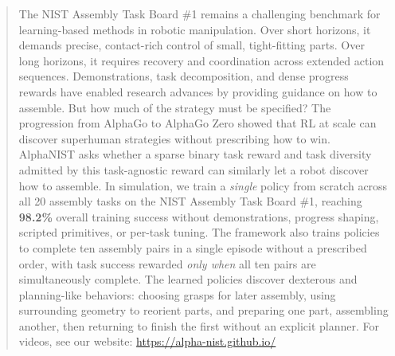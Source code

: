 \maketitle
\thispagestyle{empty}
\pagestyle{empty}

\begin{abstract}
The NIST Assembly Task Board \#1 remains a challenging benchmark for learning-based methods in robotic manipulation.
Over short horizons, it demands precise, contact-rich control of small, tight-fitting parts.
Over long horizons, it requires recovery and coordination across extended action sequences.
Demonstrations, task decomposition, and dense progress rewards have enabled research advances by providing guidance on how to assemble.
But how much of the strategy must be specified?
The progression from AlphaGo to AlphaGo Zero showed that RL at scale can discover superhuman strategies without prescribing how to win.
AlphaNIST asks whether a sparse binary task reward and task diversity admitted by this task-agnostic reward can similarly let a robot discover how to assemble.
In simulation, we train a \textit{single} policy from scratch across all 20 assembly tasks on the NIST Assembly Task Board \#1, reaching \textbf{98.2\%} overall training success without demonstrations, progress shaping, scripted primitives, or per-task tuning.
The framework also trains policies to complete ten assembly pairs in a single episode without a prescribed order, with task success rewarded \textit{only when} all ten pairs are simultaneously complete.
The learned policies discover dexterous and planning-like behaviors: choosing grasps for later assembly, using surrounding geometry to reorient parts, and preparing one part, assembling another, then returning to finish the first without an explicit planner.
For videos, see our website: \url{https://alpha-nist.github.io/}

\end{abstract}


